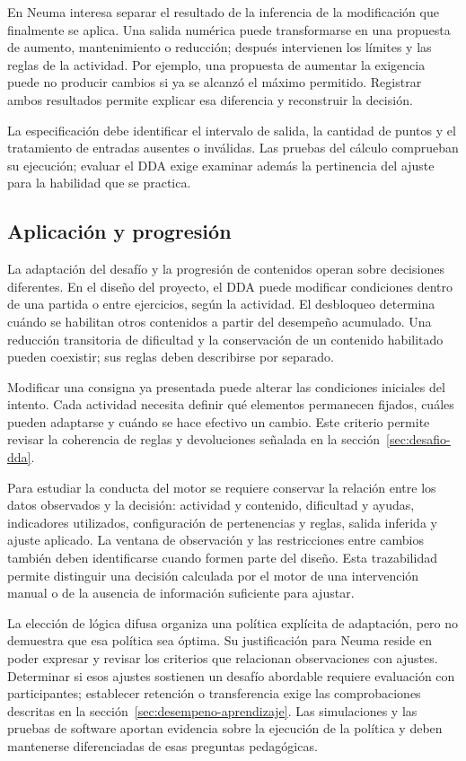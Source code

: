 En Neuma interesa separar el resultado de la inferencia de la modificación que
finalmente se aplica. Una salida numérica puede transformarse en una propuesta de
aumento, mantenimiento o reducción; después intervienen los límites y las reglas
de la actividad. Por ejemplo, una propuesta de aumentar la exigencia puede no
producir cambios si ya se alcanzó el máximo permitido. Registrar ambos resultados
permite explicar esa diferencia y reconstruir la decisión.

La especificación debe identificar el intervalo de salida, la cantidad de puntos
y el tratamiento de entradas ausentes o inválidas. Las pruebas del cálculo
comprueban su ejecución; evaluar el DDA exige examinar además la pertinencia
del ajuste para la habilidad que se practica.


\subsection{Aplicación y progresión}
\label{sec:adaptacion-progresion}
La adaptación del desafío y la progresión de contenidos operan sobre decisiones
diferentes. En el diseño del proyecto, el DDA puede modificar condiciones dentro
de una partida o entre ejercicios, según la actividad. El desbloqueo determina
cuándo se habilitan otros contenidos a partir del desempeño acumulado. Una
reducción transitoria de dificultad y la conservación de un contenido habilitado
pueden coexistir; sus reglas deben describirse por separado.

Modificar una consigna ya presentada puede alterar las condiciones iniciales del
intento. Cada actividad necesita definir qué elementos permanecen fijados, cuáles
pueden adaptarse y cuándo se hace efectivo un cambio. Este criterio permite revisar
la coherencia de reglas y devoluciones señalada en la sección~\ref{sec:desafio-dda}.

Para estudiar la conducta del motor se requiere conservar la relación entre los
datos observados y la decisión: actividad y contenido, dificultad y ayudas,
indicadores utilizados, configuración de pertenencias y reglas, salida inferida
y ajuste aplicado. La ventana de observación y las restricciones entre cambios
también deben identificarse cuando formen parte del diseño. Esta trazabilidad
permite distinguir una decisión calculada por el motor de una intervención manual
o de la ausencia de información suficiente para ajustar.

La elección de lógica difusa organiza una política explícita de adaptación, pero
no demuestra que esa política sea óptima. Su justificación para Neuma reside en
poder expresar y revisar los criterios que relacionan observaciones con ajustes.
Determinar si esos ajustes sostienen un desafío abordable requiere evaluación
con participantes; establecer retención o transferencia exige las comprobaciones
descritas en la sección~\ref{sec:desempeno-aprendizaje}. Las simulaciones y las
pruebas de software aportan evidencia sobre la ejecución de la política y deben
mantenerse diferenciadas de esas preguntas pedagógicas.


